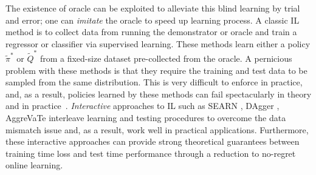 \documentclass{article}
\newcommand{\arun}[1]{\textcolor{red}{\bf Arun: {#1}}}
\begin{document}

The existence of oracle can be exploited to alleviate this blind learning by trial and error; one can \emph{imitate} the oracle to speed up learning process. A classic IL method is to collect data from running the demonstrator or oracle and train a regressor or classifier via supervised learning. These methods \cite{abbeel2004apprenticeship,syed2008apprenticeship,ratliff2006maximum,ziebart2008maximum,finn2016guided,ho2016generative} learn either a policy $\tilde \pi^*$ or $\tilde Q^*$ from a fixed-size dataset pre-collected from the oracle. A pernicious problem with these  methods is that they require the training and test data to be sampled from the same distribution.  This is very difficult to enforce in practice, and, as a result, policies learned by these methods can fail spectacularly in theory and in practice~\cite{ross2010efficient}. \emph{Interactive} approaches to IL such as SEARN \cite{daume2009search}, DAgger \cite{Ross2011_AISTATS}, AggreVaTe \cite{ross2014reinforcement} interleave learning and testing procedures to overcome the data mismatch issue and, as a result, work well in practical applications. Furthermore, these interactive approaches can provide strong theoretical guarantees between training time loss and test time performance through a reduction to no-regret online learning.


\end{document}
